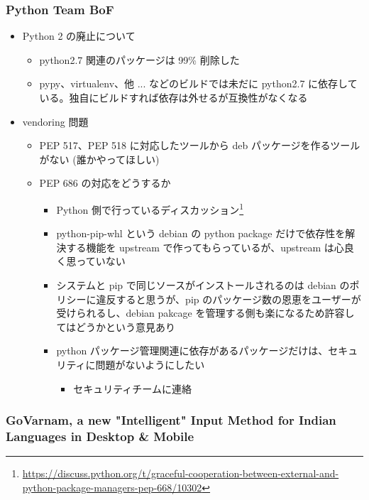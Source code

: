 \documentclass[mingoth,a4paper]{jsarticle}
\begin{document}
\subsubsection{Python Team BoF}

\begin{itemize}
\item Python 2 の廃止について
  \begin{itemize}
  \item python2.7 関連のパッケージは 99\% 削除した
  \item pypy、virtualenv、他 ... などのビルドでは未だに python2.7 に依存している。独自にビルドすれば依存は外せるが互換性がなくなる
  \end{itemize}
\item vendoring 問題
  \begin{itemize}
  \item PEP 517、PEP 518 に対応したツールから deb パッケージを作るツールがない (誰かやってほしい)
  \item PEP 686 の対応をどうするか
    \begin{itemize}
    \item Python 側で行っているディスカッション\footnote{\url{https://discuss.python.org/t/graceful-cooperation-between-external-and-python-package-managers-pep-668/10302}}
    \item python-pip-whl という debian の python package だけで依存性を解決する機能を upstream で作ってもらっているが、upstream は心良く思っていない
    \item システムと pip で同じソースがインストールされるのは debian のポリシーに違反すると思うが、pip のパッケージ数の恩恵をユーザーが受けられるし、debian pakcage を管理する側も楽になるため許容してはどうかという意見あり
    \item python パッケージ管理関連に依存があるパッケージだけは、セキュリティに問題がないようにしたい
      \begin{itemize}
      \item セキュリティチームに連絡
      \end{itemize}
    \end{itemize}
  \end{itemize}
\end{itemize}

\subsubsection{GoVarnam, a new "Intelligent" Input Method for Indian Languages in Desktop \& Mobile}
\end{document}
